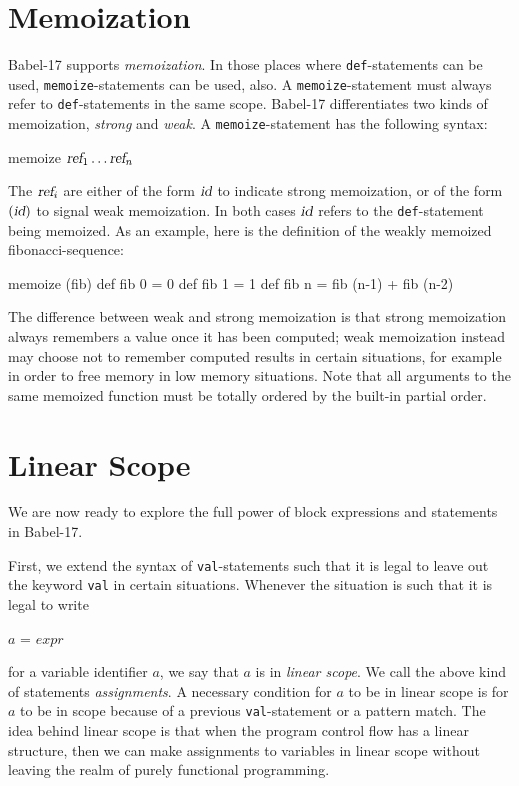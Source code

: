 \documentclass[11pt]{amsart}
\newcommand{\metababel}[1] {\textsl{#1}}
\newcommand{\babelsrc}[1] {\lstinline!#1!}
\begin{document}
\section{Memoization}
Babel-17 supports \emph{memoization}. 
In those places where \babelsrc{def}-statements can be used, \babelsrc{memoize}-statements can be used, also. A \babelsrc{memoize}-statement must always refer to \babelsrc{def}-statements in the same scope. Babel-17 differentiates two kinds of memoization, \emph{strong} and \emph{weak}. A \babelsrc{memoize}-statement has the following syntax:
\begin{babellisting}
memoize $\metababel{ref}_1 \hdots \metababel{ref}_n$
\end{babellisting}
The $\metababel{ref}_i$ are either of the form $\metababel{id}$ to indicate strong memoization, or of the form $(\metababel{id})$ to signal weak memoization. In both cases $\metababel{id}$ refers to the \babelsrc{def}-statement being memoized. As an example, here is the definition of the weakly memoized fibonacci-sequence:
\begin{babellisting}
memoize (fib)
def fib 0 = 0
def fib 1 = 1
def fib n = fib (n-1) + fib (n-2)
\end{babellisting}
The difference between weak and strong memoization is that strong memoization always remembers a value once it has been computed; weak memoization instead may choose not to remember computed results in certain situations, for example in order to free memory in low memory situations. Note that all arguments to the same memoized function must be totally ordered by the built-in partial order. 

\section{Linear Scope}
We are now ready to explore the full power of block expressions and statements in Babel-17. 

First, we extend the syntax of \babelsrc{val}-statements such that it is legal to leave out the keyword \babelsrc{val} in certain situations. Whenever the situation is such that it is legal to write
\begin{babellisting}
$a$ = $\textit{expr}$
\end{babellisting}
for a variable identifier $a$, we say that $a$ is in \emph{linear scope}. We call the above kind of statements \emph{assignments}. A necessary condition for $a$ to be in linear scope is for $a$ to be in scope because of a previous \babelsrc{val}-statement or a pattern match. 
The idea behind linear scope is that when the program control flow has a linear structure, then we can make assignments to variables in linear scope without leaving the realm of purely functional programming.
\end{document}
